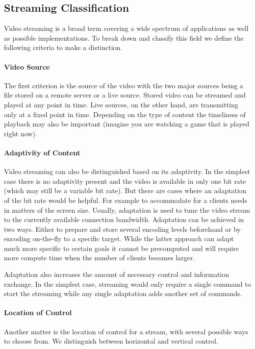 \subsection{Streaming Classification}

Video streaming is a broad term covering a wide spectrum of applications as well as possible implementations. To break down and classify this field we define the following criteria to make a distinction.

\paragraph{Video Source}
The first criterion is the source of the video with the two major sources being a file stored on a remote server or a live source. Stored video can be streamed and played at any point in time. Live sources, on the other hand, are transmitting only at a fixed point in time. Depending on the type of content the timeliness of playback may also be important (imagine you are watching a game that is played right now).


\paragraph{Adaptivity of Content}
Video streaming can also be distinguished based on its adaptivity. In the simplest case there is no adaptivity present and the video is available in only one bit rate (which may still be a variable bit rate). 
But there are cases where an adaptation of the bit rate would be helpful. For example to accommodate for a clients needs in matters of the screen size. Usually, adaptation is used to tune the video stream to the currently available connection bandwidth. Adaptation can be achieved in two ways. Either to prepare and store several encoding levels beforehand or by encoding on-the-fly to a specific target. While the latter approach can adapt much more specific to certain goals it cannot be precomputed and will require more compute time when the number of clients becomes larger.

Adaptation also increases the amount of necessary control and information exchange. In the simplest case, streaming would only require a single command to start the streaming while any single adaptation adds another set of commands.


\paragraph{Location of Control} %
Another matter is the location of control for a stream, with several possible ways to choose from. We distinguish between horizontal and vertical control.

